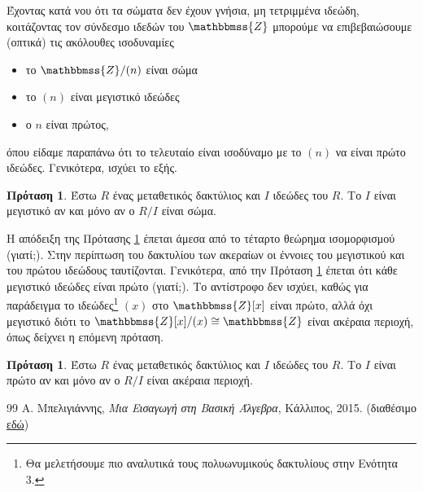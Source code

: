 \documentclass[12pt,a4paper,reqno]{amsart}
\theoremstyle{definition}
\newtheorem{proposition}[theorem]{Πρόταση}
\theoremstyle{remark}
\numberwithin{theorem}{section}
\numberwithin{exercise}{section}
\numberwithin{equation}{section}
\newcommand{\ZZ}{\mathbbmss{Z}}
\begin{document}
Έχοντας κατά νου ότι τα σώματα δεν έχουν γνήσια, μη τετριμμένα ιδεώδη, κοιτάζοντας τον σύνδεσμο ιδεδών του $\ZZ$ μπορούμε να επιβεβαιώσουμε (οπτικά) τις ακόλουθες ισοδυναμίες 
\begin{itemize}
    \item το $\ZZ/(n)$ είναι σώμα 
    \item το $(n)$ είναι μεγιστικό ιδεώδες 
    \item ο $n$ είναι πρώτος,
\end{itemize}
όπου είδαμε παραπάνω ότι το τελευταίο είναι ισοδύναμο με το $(n)$ να είναι πρώτο ιδεώδες. Γενικότερα, ισχύει το εξής.

\begin{proposition}
    \label{prop:maximal_ideals_characterization}
    Έστω $R$ ένας μεταθετικός δακτύλιος και $I$ ιδεώδες του $R$. Το $I$ είναι μεγιστικό αν και μόνο αν ο $R/I$ είναι σώμα.
\end{proposition}

Η απόδειξη της Πρότασης \ref{prop:maximal_ideals_characterization} έπεται άμεσα από το τέταρτο θεώρημα ισομορφισμού (γιατί;). Στην περίπτωση του δακτυλίου των ακεραίων οι έννοιες του μεγιστικού και του πρώτου ιδεώδους ταυτίζονται. Γενικότερα, από την Πρόταση \ref{prop:maximal_ideals_characterization} έπεται ότι κάθε μεγιστικό ιδεώδες είναι πρώτο (γιατί;). Το αντίστροφο δεν ισχύει, καθώς για παράδειγμα το ιδεώδες\footnote{Θα μελετήσουμε πιο αναλυτικά τους πολυωνυμικούς δακτυλίους στην Ενότητα 3.} $(x)$ στο $\ZZ[x]$ είναι πρώτο, αλλά όχι μεγιστικό διότι το $\ZZ[x]/(x) \cong \ZZ$ είναι ακέραια περιοχή, όπως δείχνει η επόμενη πρόταση.

\begin{proposition}
    \label{prop:prime_ideals_characterization}
    Έστω $R$ ένας μεταθετικός δακτύλιος και $I$ ιδεώδες του $R$. Το $I$ είναι πρώτο αν και μόνο αν ο $R/I$ είναι ακέραια περιοχή.
\end{proposition}

\begin{thebibliography}{99}
    Α. Μπελιγιάννης, 
    \textit{Μια Εισαγωγή στη Βασική Άλγεβρα},
    Κάλλιπος, 2015. (διαθέσιμο \href{https://dx.doi.org/10.57713/kallipos-547}{εδώ})
\end{thebibliography}
\end{document}
